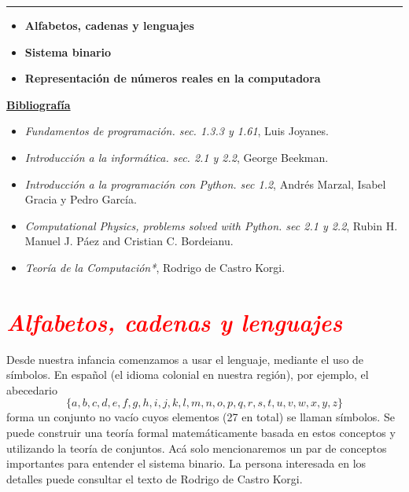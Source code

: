 \documentclass[12pt]{article}
\begin{document}
		\thispagestyle{firstpage}
		\vspace*{1.5cm}
	
	\begin{center}
		\rule{\textwidth}{0.4pt}
	\end{center}
	
	\begin{itemize}[leftmargin=*,label=\textcolor{red}{\ensuremath{\blacktriangleright}}]
		\item \textbf{Alfabetos, cadenas y lenguajes}
		\item \textbf{Sistema binario}
		\item \textbf{Representación de números reales en la computadora}
	\end{itemize}
	
	\noindent
	\textbf{\underline{Bibliografía}}
	\begin{itemize}[leftmargin=*, label={\textcolor{blue}{$\bullet$}}]
		\item \textit{Fundamentos de programación. sec. 1.3.3 y 1.61}, Luis Joyanes.
		\item \textit{Introducción a la informática. sec. 2.1 y 2.2},  George Beekman.
		\item \textit{Introducción a la programación con Python. sec 1.2}, Andrés Marzal, Isabel Gracia y Pedro García.
		\item \textit{Computational Physics, problems solved with Python. sec 2.1 y 2.2}, Rubin H. Manuel J. Páez and Cristian C. Bordeianu.
		\item \textit{Teoría de la Computación*}, Rodrigo de Castro Korgi.
	\end{itemize}
     
	\section*{\textcolor{red}{\textit{Alfabetos, cadenas y lenguajes}}}

	Desde nuestra infancia comenzamos a usar el lenguaje, mediante el uso de símbolos. 
	En español (el idioma colonial en nuestra región), por ejemplo, el abecedario
	$$\{a, b, c, d, e, f, g, h, i, j, k, l, m, n, o, p, q, r, s, t, u, v, w, x, y, z\}$$ 
	forma un conjunto no vacío cuyos elementos (27 en total) se llaman símbolos. 
	Se puede construir una teoría formal matemáticamente basada en estos conceptos y 
    utilizando la teoría de conjuntos. Acá solo 
	mencionaremos un par de conceptos importantes para entender el sistema binario. 
	La persona interesada en los detalles puede consultar el texto de Rodrigo de Castro Korgi.
\end{document}

